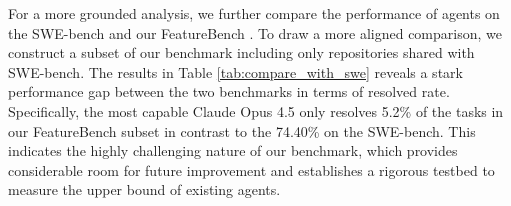 \documentclass{article}
\def\name{FeatureBench }
\begin{document}
For a more grounded analysis, we further compare the performance of agents on the SWE-bench and our \name. To draw a more aligned comparison, we construct a subset of our benchmark including only repositories shared with SWE-bench. The results in Table \ref{tab:compare_with_swe} reveals a stark performance gap between the two benchmarks in terms of resolved rate. Specifically, the most capable Claude Opus 4.5 only resolves 5.2\% of the tasks in our \name subset in contrast to the 74.40\% on the SWE-bench. This indicates the highly challenging nature of our benchmark, which provides considerable room for future improvement and establishes a rigorous testbed to measure the upper bound of existing agents.

\begin{figure}[t]
    \centering
    \begin{minipage}{0.48\textwidth}  
        \centering
        \label{tab:human_verifaction}
    \end{minipage}
    \hfill
    \begin{minipage}{0.46\textwidth}  
        \centering
\end{minipage}
\end{figure}
\end{document}
